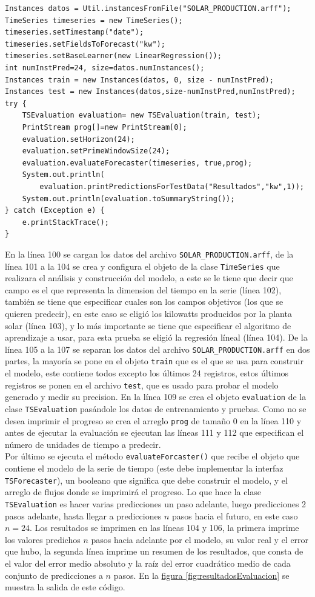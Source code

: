 \begin{lstlisting}[frame=single]  
Instances datos = Util.instancesFromFile("SOLAR_PRODUCTION.arff");
TimeSeries timeseries = new TimeSeries();
timeseries.setTimestamp("date");
timeseries.setFieldsToForecast("kw");
timeseries.setBaseLearner(new LinearRegression());
int numInstPred=24, size=datos.numInstances();
Instances train = new Instances(datos, 0, size - numInstPred);
Instances test = new Instances(datos,size-numInstPred,numInstPred);
try {
	TSEvaluation evaluation= new TSEvaluation(train, test);		
	PrintStream prog[]=new PrintStream[0];
	evaluation.setHorizon(24);
	evaluation.setPrimeWindowSize(24);
	evaluation.evaluateForecaster(timeseries, true,prog);
	System.out.println(
		evaluation.printPredictionsForTestData("Resultados","kw",1));
	System.out.println(evaluation.toSummaryString());
} catch (Exception e) {
	e.printStackTrace();
}
\end{lstlisting}
En la línea 100 se cargan los datos del archivo \texttt{SOLAR\_PRODUCTION.arff}, de la línea 101 a la 104 se crea y configura el objeto de la clase \texttt{TimeSeries} que realizara el análisis y construcción del modelo, a este se le tiene que decir que campo es el que representa la dimension del tiempo en la serie (línea 102), también se tiene que especificar cuales son los campos objetivos (los que se quieren predecir), en este caso se eligió los kilowatts producidos por la planta solar (línea 103), y lo más importante se tiene que especificar el algoritmo de aprendizaje a usar, para esta prueba se eligió la regresión líneal (línea 104).
De la línea 105 a la 107 se separan los datos del archivo \texttt{SOLAR\_PRODUCTION.arff} en dos partes, la mayoría se pone en el objeto \texttt{train} que es el que se usa para construir el modelo, este contiene todos excepto los últimos 24 registros, estos últimos registros se ponen en el archivo \texttt{test}, que es usado para probar el modelo generado y medir su precision.
En la línea 109 se crea el objeto \texttt{evaluation} de la clase \texttt{TSEvaluation} pasándole los datos de entrenamiento y pruebas. Como no se desea imprimir el progreso se crea el arreglo \texttt{prog} de tamaño 0 en la línea 110 y  antes de ejecutar la evaluación se ejecutan las líneas 111 y 112 que especifican el número de unidades de tiempo a predecir.
\\Por último se ejecuta el método \texttt{evaluateForcaster()} que recibe el objeto que contiene el modelo de la serie de tiempo (este debe implementar la interfaz \texttt{TSForecaster}), un booleano que significa que debe construir el modelo, y el arreglo de flujos donde se imprimirá el progreso. 
Lo que hace la clase \texttt{TSEvaluation} es hacer varias predicciones un paso adelante, luego predicciones 2 pasos adelante, hasta llegar a predicciones $n$ pasos hacia el futuro, en este caso $n=24$.
Los resultados se imprimen en las líneas 104 y 106, la primera imprime los valores predichos $n$ pasos hacia adelante por el modelo, su valor real y el error que hubo, la segunda línea imprime un resumen de los resultados, que consta de el valor del error medio absoluto y la raíz del error cuadrático medio de cada conjunto de predicciones a $n$ pasos. En la  \hyperref[fig:resultadosEvaluacion]{figura \ref{fig:resultadosEvaluacion}} se muestra la salida de este código. 

